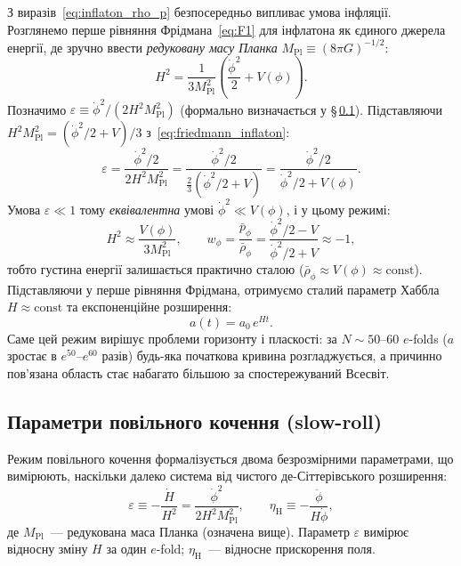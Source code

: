 \documentclass[12pt, a4paper]{article}
\begin{document}
З виразів~\eqref{eq:inflaton_rho_p} безпосередньо випливає умова
інфляції. Розглянемо перше рівняння Фрідмана~\eqref{eq:F1} для
інфлатона як єдиного джерела енергії, де зручно ввести
\emph{редуковану масу Планка} $M_\mathrm{Pl} \equiv (8\pi G)^{-1/2}$:
\begin{equation}\label{eq:friedmann_inflaton}
  H^2 = \frac{1}{3M_\mathrm{Pl}^2}
        \left(\frac{\dot\phi^2}{2} + V(\phi)\right).
\end{equation}
Позначимо $\varepsilon \equiv \dot\phi^2/(2H^2 M_\mathrm{Pl}^2)$
(формально визначається у §\,\ref{subsec:slowroll}).
Підставляючи $H^2 M_\mathrm{Pl}^2 = (\dot\phi^2/2 + V)/3$
з~\eqref{eq:friedmann_inflaton}:
\begin{equation*}
  \varepsilon
    = \frac{\dot\phi^2/2}{2H^2 M_\mathrm{Pl}^2}
    = \frac{\dot\phi^2/2}{\tfrac{2}{3}(\dot\phi^2/2 + V)}
    = \frac{\dot\phi^2/2}{\dot\phi^2/2 + V(\phi)}.
\end{equation*}
Умова $\varepsilon \ll 1$ тому \emph{еквівалентна} умові
$\dot\phi^2 \ll V(\phi)$, і у цьому режимі:
\begin{equation*}
  H^2 \approx \frac{V(\phi)}{3M_\mathrm{Pl}^2}, \qquad
  w_\phi = \frac{\bar{p}_\phi}{\bar{\rho}_\phi}
         = \frac{\dot\phi^2/2 - V}{\dot\phi^2/2 + V} \approx -1,
\end{equation*}
тобто густина енергії залишається практично сталою
($\bar{\rho}_\phi \approx V(\phi) \approx \mathrm{const}$).
Підставляючи у перше рівняння Фрідмана, отримуємо
сталий параметр Хаббла $H \approx \mathrm{const}$ та
експоненційне розширення:
\begin{equation}\label{eq:a_exponential}
  a(t) = a_0\,e^{Ht}.
\end{equation}
Саме цей режим вирішує проблеми горизонту і пласкості: за $N \sim
50$--$60$ $e$-folds ($a$ зростає в $e^{50}$--$e^{60}$ разів)
будь-яка початкова кривина розгладжується, а причинно пов'язана
область стає набагато більшою за спостережуваний Всесвіт.

\subsection{Параметри повільного кочення (slow-roll)}
\label{subsec:slowroll}

Режим повільного кочення формалізується двома безрозмірними
параметрами, що вимірюють, наскільки далеко система від чистого
де-Сіттерівського розширення:
\begin{equation}\label{eq:slow_roll_def}
  \varepsilon \equiv -\frac{\dot H}{H^2}
             = \frac{\dot\phi^2}{2H^2 M_\mathrm{Pl}^2},
  \qquad
  \eta_{\mathrm{H}} \equiv -\frac{\ddot{\phi}}{H\dot{\phi}},
\end{equation}
де $M_\mathrm{Pl}$~--- редукована маса Планка (означена вище).
Параметр $\varepsilon$ вимірює відносну зміну $H$ за один $e$-fold;
$\eta_{\mathrm{H}}$~--- відносне прискорення поля.
\end{document}
